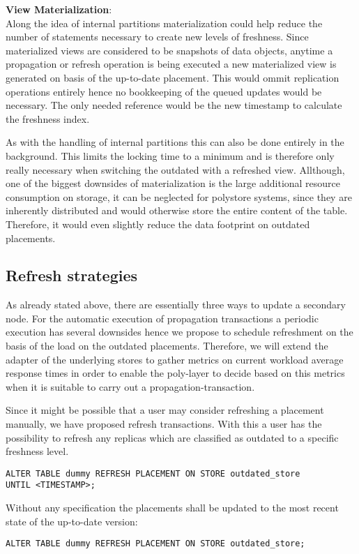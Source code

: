 \textbf{View Materialization}:\\
Along the idea of internal partitions materialization could help reduce the number of statements necessary to create new levels of freshness.
Since materialized views are considered to be snapshots of data objects, anytime a propagation or refresh operation is being executed a new materialized view is 
generated on basis of the up-to-date placement.
This would ommit replication operations entirely hence no bookkeeping of the queued updates would be necessary. The only needed reference would be the new timestamp
to calculate the freshness index.

As with the handling of internal partitions this can also be done entirely in the background. This limits the locking time to a minimum and is therefore only really 
necessary when switching the outdated with a refreshed view.
Allthough, one of the biggest downsides of materialization is the large additional resource consumption on storage, it can be neglected for polystore systems, since they are
inherently distributed and would otherwise store the entire content of the table. Therefore, it would even slightly reduce the data footprint on outdated placements.







\subsection{Refresh strategies}
As already stated above, there are essentially three ways to update a secondary node. 
For the automatic execution of propagation transactions a periodic execution has several downsides hence we propose to schedule
refreshment on the basis of the load on the outdated placements. Therefore, we will extend the adapter of the underlying stores to gather metrics on current workload
average response times in order to enable the poly-layer to decide based on this metrics when it is suitable to carry out a propagation-transaction.


Since it might be possible that a user may consider refreshing a placement manually, we have proposed refresh transactions. With this a user has the possibility to refresh
any replicas which are classified as outdated to a specific freshness level.
\begin{verbatim}
ALTER TABLE dummy REFRESH PLACEMENT ON STORE outdated_store 
UNTIL <TIMESTAMP>;
\end{verbatim}
Without any specification the placements shall be updated to the most recent state of the up-to-date version:
\begin{verbatim}
ALTER TABLE dummy REFRESH PLACEMENT ON STORE outdated_store;
\end{verbatim}

